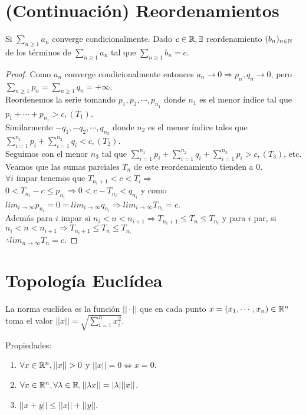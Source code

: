 \section{(Continuación) Reordenamientos}

\begin{theorem}
  Si $\sum_{n \geq 1} a_n$ converge condicionalmente. Dado $c \in \mathbb{R}, \exists$ reordenamiento $(b_n)_{n \in \mathbb{N}}$ de los términos de $\sum_{n \geq 1} a_n$ tal que $\sum_{n \geq 1} b_n = c$.
  \begin{proof}
    Como $a_n$ converge condicionalmente entonces $a_n \to 0 \Rightarrow p_n, q_n \to 0$, pero $\sum_{n \geq 1} p_n = \sum_{n \geq 1} q_n = +\infty$. \\
    Reordenemos la serie tomando $p_1, p_2, \cdots, p_{n_1}$ donde $n_1$ es el menor índice tal que $p_1 + \cdots + p_{n_1} > c, (T_1)$. \\
    Similarmente $-q_1, -q_2, \cdots, q_{n_2}$ donde $n_2$ es el menor índice tales que $\sum_{i = 1}^{n_1} p_i + \sum_{i = 1}^{n_2} q_i < c, (T_2)$. \\
    Seguimos con el menor $n_3$ tal que $\sum_{i = 1}^{n_1} p_i + \sum_{i = 1}^{n_2} q_i + \sum_{i = 1}^{n_3} p_i > c, (T_3)$, etc. \\
    Veamos que las sumas parciales $T_n$ de este reordenamiento tienden a 0. \\
    $\forall i$ impar tenemos que $T_{n_i +1} < c < T_i \Rightarrow$ \\
    $0 < T_{n_i} - c \leq p_{n_i} \Rightarrow 0 < c - T_{n_i} < q_{n_i}$ y como $lim_{i \to \infty} p_{n_i} = 0 = lim_{i \to \infty} q_{n_i} \Rightarrow lim_{i \to \infty} T_{n_i} = c$. \\
    Además para $i$ impar si $n_i < n < n_{i+1} \Rightarrow T_{n_i+1} \leq T_n \leq T_{n_i}$ y para $i$ par, si $n_i < n < n_{i+1} \Rightarrow T_{n_i+1} \leq T_n \leq T_{n_i}$ \\
    $\therefore lim_{n \to \infty} T_n = c$.
  \end{proof}
\end{theorem}

\section{Topología Euclídea}

\begin{definition}
  La norma euclídea es la función $|| \cdot ||$ que en cada punto $x = (x_1, \cdots, x_n) \in \mathbb{R}^n$ toma el valor $||x|| = \sqrt{\sum_{i = 1}^n x_i^2}$.

  Propiedades: \\
  \begin{enumerate}
    \item $\forall x \in \mathbb{R}^n, ||x|| > 0$ y $||x|| = 0 \iff x = 0$.
    \item $\forall x \in \mathbb{R}^n, \forall \lambda \in \mathbb{R}, || \lambda x|| = |\lambda| ||x||$.
    \item $||x+y|| \leq ||x|| + ||y||$.
  \end{enumerate}
\end{definition}

